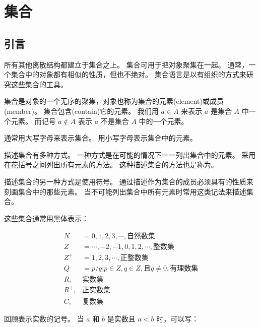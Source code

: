 
\section{集合}
{
    \subsection{引言}
    {
        所有其他离散结构都建立于集合之上。
        集合可用于把对象聚集在一起。
        通常，一个集合中的对象都有相似的性质，但也不绝对。
        集合语言是以有组织的方式来研究这些集合的工具。

        \begin{defines}
            集合是对象的一个无序的聚集，对象也称为集合的元素(element)或成员(member)。
            集合包含(contain)它的元素。
            我们用 $a \in A$ 来表示 $a$ 是集合 $A$ 中一个元素。
            而记号 $a \notin A$ 表示 $a$ 不是集合 $A$ 中的一个元素。
        \end{defines}

        通常用大写字母来表示集合。
        用小写字母表示集合中的元素。

        描述集合有多种方式。
        一种方式是在可能的情况下一一列出集合中的元素。
        采用在花括号之间列出所有元素的方法。
        这种描述集合的方法也是称为。

        描述集合的另一种方式是使用符号。
        通过描述作为集合的成员必须具有的性质来刻画集合中的那些元素。
        当不可能列出集合中所有元素时常用这类记法来描述集合。

        这些集合通常用黑体表示：

        \begin{align*}
            N &= {0, 1, 2, 3, \cdots}, \text{自然数集} \\
            Z &= {\cdots, -2, -1, 0, 1, 2, \cdots}, \text{整数集} \\
            Z^+ &= {1, 2, 3, \cdots}, \text{正整数集} \\
            Q &= {p / q | p \in Z, q \in Z, \text{且} q \neq 0}, \text{有理数集} \\
            R, &\text{实数集} \\
            R^+, &\text{正实数集} \\
            C, &\text{复数集}
        \end{align*}

        回顾表示实数的记号。
        当 $a$ 和 $b$ 是实数且 $a < b$ 时，可以写：

}}
